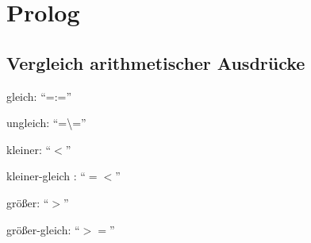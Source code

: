 \chapter{Prolog}
\section{Vergleich arithmetischer Ausdrücke}
\begin{compactitem}
	\item gleich: \enquote{=:=}
	\item ungleich: \enquote{=\textbackslash =}
	\item kleiner: \enquote{$<$}
	\item kleiner-gleich : \enquote{$=<$}
	\item größer: \enquote{$>$}
	\item größer-gleich: \enquote{$>=$}
\end{compactitem}

